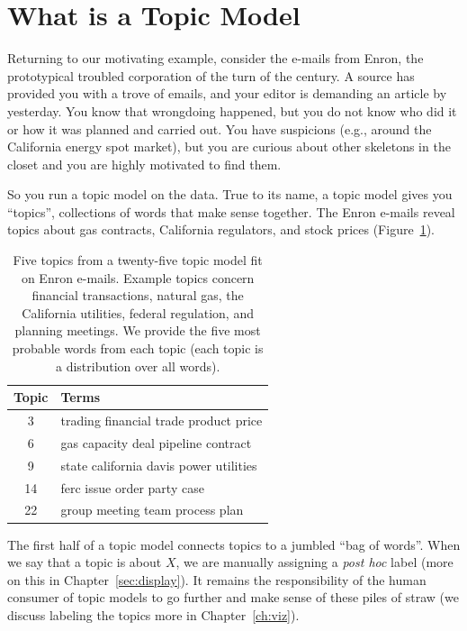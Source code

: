 \section{What is a Topic Model}

Returning to our motivating example, consider the e-mails from Enron, the prototypical
troubled corporation of the turn of the century.  A source has provided you with a trove of emails, and your editor is demanding an article by yesterday.  You know
that wrongdoing happened, but you do not know who did it or how it was planned
and carried out.  You have suspicions (e.g., around the California energy spot market),
but you are curious about other skeletons in the closet and
you are highly motivated to find them.

So you run a topic model on the data.  True to its name, a topic model
gives you ``topics'', collections of words that make sense together.
The Enron e-mails reveal topics about gas contracts,
California regulators, and stock prices
(Figure~\ref{tab:enron_topics}).

\begin{table}
  \caption{Five topics from a twenty-five topic model fit on Enron
    e-mails.  Example topics concern financial transactions, natural
    gas, the California utilities, federal regulation, and planning
    meetings.  We provide the five most probable words from each topic
  (each topic is a distribution over all words).}
  \label{tab:enron_topics}

\begin{center}
\begin{tabular}{cp{10cm}}
\hline
\rowcolor{gray!50}
\hline
Topic & Terms \\
\hline \hline
3 & trading financial trade product price  \\
6 & gas capacity deal pipeline contract \\
9 & state california davis power utilities \\
14 & ferc issue order party case \\
22 & group meeting team process plan \\
\hline
\end{tabular}
\end{center}
\end{table}

The first half of a topic model connects topics to a jumbled ``bag of words''.
When we say that a topic is about $X$, we are manually assigning a \textit{post hoc} label
 (more on this in Chapter~\ref{sec:display}).
It remains the responsibility of the human consumer of topic models to go further and
make sense of these piles of straw (we discuss labeling the topics
more in Chapter~\ref{ch:viz}).


